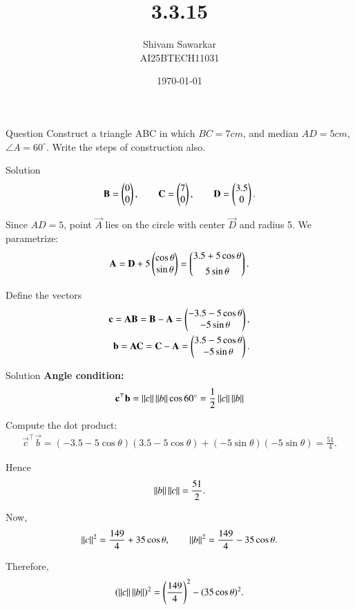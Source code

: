 \documentclass{beamer}
\title %
{3.3.15}
\date{\today}
\author %
{Shivam Sawarkar \\ AI25BTECH11031}
\begin{document}
\frame{\titlepage}
\begin{frame}{Question}
    Construct a triangle ABC in which $BC = 7 cm$, and median $AD = 5 cm$, $\angle A=60^\circ$. Write the steps of construction also.
\end{frame}

\begin{frame}{Solution}
    \begin{align}
\mathbf{B}=\begin{pmatrix}0\\0\end{pmatrix},\qquad 
\mathbf{C}=\begin{pmatrix}7\\0\end{pmatrix},\qquad 
\mathbf{D}=\begin{pmatrix}3.5\\0\end{pmatrix}.
\end{align}

Since $AD=5$, point $\vec{A}$ lies on the circle with center $\vec{D}$ and radius 5.  
We parametrize:
\begin{align}
\mathbf{A}=\mathbf{D}+5\begin{pmatrix}\cos\theta\\ \sin\theta\end{pmatrix}
=\begin{pmatrix}3.5+5\cos\theta\\[4pt]5\sin\theta\end{pmatrix}.
\end{align}

Define the vectors
\begin{align}
\mathbf{c}=\mathbf{AB}=\mathbf{B}-\mathbf{A}
=\begin{pmatrix}-3.5-5\cos\theta\\ -5\sin\theta\end{pmatrix},\\ 
\mathbf{b}=\mathbf{AC}=\mathbf{C}-\mathbf{A}
=\begin{pmatrix}3.5-5\cos\theta\\ -5\sin\theta\end{pmatrix}.
\end{align}
\end{frame}

\begin{frame}{Solution}
    \textbf{Angle condition:}  
\begin{align}
\mathbf{c}^\top \mathbf{b}=\left\lVert c\right\rVert\left\lVert b\right\rVert\cos60^\circ
=\dfrac{1}{2}\left\lVert c\right\rVert\left\lVert b\right\rVert
\end{align}

Compute the dot product:
\begin{align}
\vec{c}^\top \vec{b}
=(-3.5-5\cos\theta)(3.5-5\cos\theta)+(-5\sin\theta)(-5\sin\theta)
=\frac{51}{4}.
\end{align}

Hence
\begin{align}
\left\lVert b\right\rVert\left\lVert c\right\rVert=\frac{51}{2}.
\end{align}

Now,
\begin{align}
\left\lVert c\right\rVert^2=\dfrac{149}{4}+35\cos\theta,\qquad
\left\lVert b\right\rVert^2=\dfrac{149}{4}-35\cos\theta.
\end{align}

Therefore,
\begin{align}
(\left\lVert c\right\rVert\left\lVert b\right\rVert)^2
=\left(\dfrac{149}{4}\right)^2-(35\cos\theta)^2.
\end{align}
\end{frame}
\end{document}
